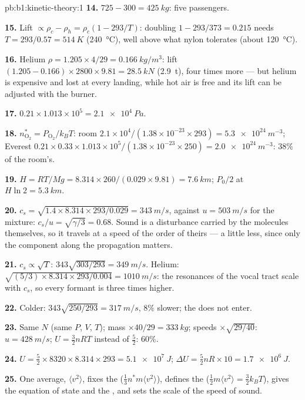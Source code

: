 \begin{solution}{pb:b1:kinetic-theory:1}
\textbf{14.} $725 - 300 = \qty{425}{kg}$: five passengers.

\textbf{15.} Lift $\propto \rho_c - \rho_h = \rho_c(1 - 293/T)$: doubling
$1 - 293/373 = 0.215$ needs $T = 293/0.57 = \qty{514}{K}$ (\qty{240}{\degreeCelsius}),
well above what nylon tolerates (about \qty{120}{\degreeCelsius}).

\textbf{16.} Helium $\rho = 1.205 \times 4/29 = \qty{0.166}{kg/m^3}$: lift
$(1.205 - 0.166) \times 2800 \times 9.81 = \qty{28.5}{kN}$ (\qty{2.9}{t}), four
times more --- but helium is expensive and lost at every landing, while
hot air is free and its lift can be adjusted with the burner.

\textbf{17.} $0.21 \times 1.013\times10^5 = \qty{2.1e4}{Pa}$.

\textbf{18.} $n^*_{\mathrm{O}_2} = P_{\mathrm{O}_2}/k_BT$: room $2.1\times10^4/
(1.38\times10^{-23} \times 293) = \qty{5.3e24}{m^{-3}}$; Everest $0.21 \times 0.33
\times 1.013\times10^5/(1.38\times10^{-23} \times 250) = \qty{2.0e24}{m^{-3}}$:
$38\%$ of the room's.

\textbf{19.} $H = RT/Mg = 8.314 \times 260/(0.029 \times 9.81) = \qty{7.6}{km}$;
$P_0/2$ at $H\ln 2 = \qty{5.3}{km}$.

\textbf{20.} $c_s = \sqrt{1.4 \times 8.314 \times 293/0.029} = \qty{343}{m/s}$,
against $u = \qty{503}{m/s}$ for the mixture: $c_s/u = \sqrt{\gamma/3} = 0.68$.
Sound is a disturbance carried by the molecules themselves, so it
travels at a speed of the order of theirs --- a little less, since
only the component along the propagation matters.

\textbf{21.} $c_s \propto \sqrt T$: $343\sqrt{303/293} = \qty{349}{m/s}$.
Helium: $\sqrt{(5/3) \times 8.314 \times 293/0.004} = \qty{1010}{m/s}$: the
resonances of the vocal tract scale with $c_s$, so every formant is
three times higher.

\textbf{22.} Colder: $343\sqrt{250/293} = \qty{317}{m/s}$, $8\%$ slower;
the  does not enter.

\textbf{23.} Same $N$ (same $P$, $V$, $T$); mass $\times 40/29 = \qty{333}{kg}$;
speeds $\times\sqrt{29/40}$: $u = \qty{428}{m/s}$; $U = \tfrac32 nRT$ instead of
$\tfrac52$: $60\%$.

\textbf{24.} $U = \tfrac52 \times 8320 \times 8.314 \times 293 = \qty{5.1e7}{J}$;
$\Delta U = \tfrac52 nR \times 10 = \qty{1.7e6}{J}$.

\textbf{25.} One average, $\langle v^2\rangle$, fixes the 
($\tfrac13 n^*m\langle v^2\rangle$), defines the 
($\tfrac12 m\langle v^2\rangle = \tfrac32 k_BT$), gives the equation of state
and the , and sets the scale of the speed of sound.
\end{solution}
